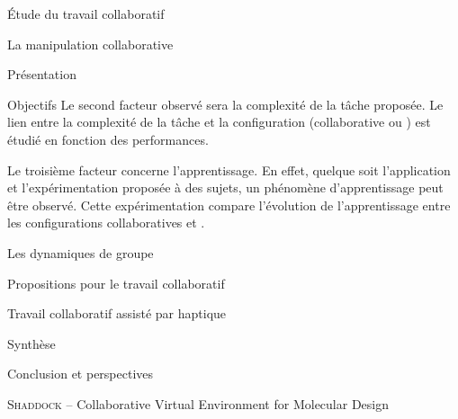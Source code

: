 \documentclass[myfrancais]{mythesis}
\begin{document}
\begin{mypart}{Étude du travail collaboratif}
\begin{mychapter}{La manipulation collaborative}
\begin{mysection}{Présentation}
\begin{mysubsection}{Objectifs}
					Le second facteur observé sera la complexité de la tâche proposée.
					Le lien entre la complexité de la tâche et la configuration (collaborative ou ) est étudié en fonction des performances.

					Le troisième facteur concerne l'apprentissage.
					En effet, quelque soit l'application et l'expérimentation proposée à des sujets, un phénomène d'apprentissage peut être observé.
					Cette expérimentation compare l'évolution de l'apprentissage entre les configurations collaboratives et .
				\end{mysubsection}
			\end{mysection}
		\end{mychapter}
		\begin{mychapter}{Les dynamiques de groupe}
		\end{mychapter}
	\end{mypart}
	\begin{mypart}{Propositions pour le travail collaboratif}
		\begin{mychapter}{Travail collaboratif assisté par haptique}
		\end{mychapter}
	\end{mypart}
	\begin{mypart}{Synthèse}
		\begin{mychapter}{Conclusion et perspectives}
		\end{mychapter}
	\end{mypart}

	\myglossary
	\appendix
	\begin{mychapter}{\textsc{Shaddock} -- Collaborative Virtual Environment for Molecular Design}
	\end{mychapter}
\end{document}

